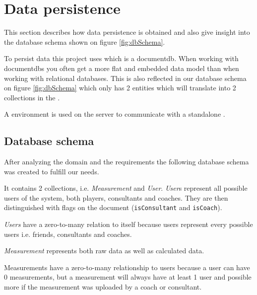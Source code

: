 \section{Data persistence}
This section describes how data persistence is obtained and also give insight into the database schema shown on figure \ref{fig:dbSchema}.

To persist data this project uses  which is a \gls{documentdb}.
When working with \glspl{documentdb} you often get a more flat and embedded data model than when working with relational databases. 
This is also reflected in our database schema on figure \ref{fig:dbSchema} which only has 2 entities which will translate into 2 collections in the .

A  environment is used on the server to communicate with a standalone .

\subsection{Database schema}
After analyzing the domain and the requirements the following database schema was created to fulfill our needs.

It contains 2 collections, i.e. \textit{Measurement} and \textit{User}. \textit{User}s represent all possible users of the system, both players, consultants and coaches. 
They are then distinguished with flags on the document (\verb+isConsultant+ and \verb+isCoach+).

\textit{Users} have a zero-to-many relation to itself because users represent every possible users i.e. friends, consultants and coaches.

\textit{Measurement} represents both raw data as well as calculated data.

Measurements have a zero-to-many relationship to users because a user can have 0 measurements, but a measurement will always have at least 1 user and possible more if the measurement was uploaded by a coach or consultant.

